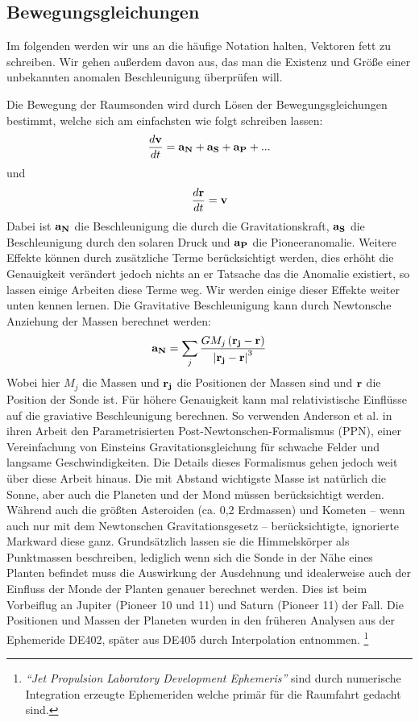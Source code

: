 
\subsection{Bewegungsgleichungen}
Im folgenden werden wir uns an die häufige Notation halten, Vektoren fett zu schreiben. Wir gehen außerdem davon aus, das man die Existenz und Größe einer unbekannten anomalen Beschleunigung überprüfen will.

Die Bewegung der Raumsonden wird durch Lösen der Bewegungsgleichungen bestimmt, welche sich am einfachsten wie folgt schreiben lassen:
\begin{equation}
\frac{d{\bf v}}{dt}={\bf a_N} + {\bf a_S} + {\bf a_P} + ...
\end{equation}
und
\begin{equation}
\frac{d{\bf r}}{dt}={\bf v}
\end{equation}
Dabei ist $\bf a_N$ die Beschleunigung die durch die Gravitationskraft, $\bf a_S$ die Beschleunigung durch den solaren Druck und $\bf a_P$ die Pioneeranomalie. Weitere Effekte können durch zusätzliche Terme berücksichtigt werden, dies erhöht die Genauigkeit verändert jedoch nichts an er Tatsache das die Anomalie existiert, so lassen einige Arbeiten diese Terme weg. Wir werden einige dieser Effekte weiter unten kennen lernen.
Die Gravitative Beschleunigung kann durch Newtonsche Anziehung der Massen berechnet werden:
\begin{equation}
{\bf a_N} = \sum_j \frac{GM_j\left({\bf r_j}-{\bf r}\right)}{\left| {\bf r_j}-{\bf r} \right|^3}
\end{equation}
Wobei hier $M_j$ die Massen und $\bf r_j$ die Positionen der Massen sind und $\bf r$ die Position der Sonde ist.
Für höhere Genauigkeit kann mal relativistische Einflüsse auf die graviative Beschleunigung berechnen. So verwenden Anderson et al. in ihren Arbeit den Parametrisierten Post-Newtonschen-Formalismus (PPN), einer Vereinfachung von Einsteins Gravitationsgleichung für schwache Felder und langsame Geschwindigkeiten.
Die Details dieses Formalismus gehen jedoch weit über diese Arbeit hinaus.
Die mit Abstand wichtigste Masse ist natürlich die Sonne, aber auch die Planeten und der Mond müssen berücksichtigt werden.
Während \cite{Anderson2002} auch die größten Asteroiden (ca. 0,2 Erdmassen) und Kometen – wenn auch nur mit dem Newtonschen Gravitationsgesetz – berücksichtigte, ignorierte Markward diese ganz.
Grundsätzlich lassen sie die Himmelskörper als Punktmassen beschreiben, lediglich wenn sich die Sonde in der Nähe eines Planten befindet muss die Auswirkung der Ausdehnung und idealerweise auch der Einfluss der Monde der Planten genauer berechnet werden. Dies ist beim Vorbeiflug an Jupiter (Pioneer 10 und 11) und Saturn (Pioneer 11) der Fall.
Die Positionen und Massen der Planeten wurden in den früheren Analysen aus der Ephemeride
DE402, später aus DE405 durch Interpolation entnommen.
\footnote{\textit{``Jet Propulsion Laboratory Development Ephemeris''} sind durch
numerische Integration erzeugte Ephemeriden welche primär für die Raumfahrt gedacht sind.}\cite{Anderson2002}

